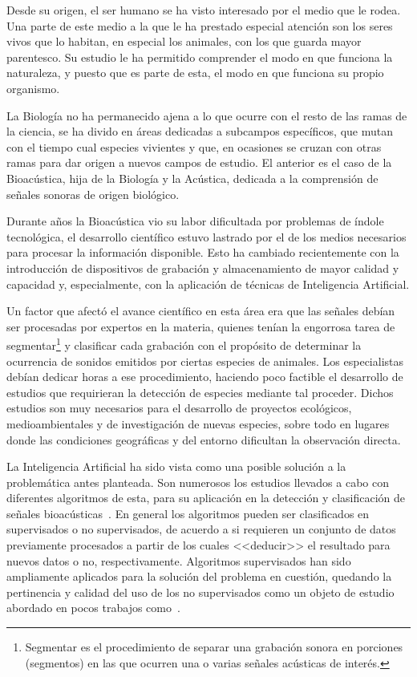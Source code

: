 Desde su origen, el ser humano se ha visto interesado por el medio que le rodea.
Una parte de este medio a la que le ha prestado especial atención son los seres vivos que lo habitan, en especial los animales, con los que guarda mayor parentesco.
Su estudio le ha permitido comprender el modo en que funciona la naturaleza, y puesto que es parte de esta, el modo en que funciona su propio organismo.

La Biología no ha permanecido ajena a lo que ocurre con el resto de las ramas de la ciencia, se ha divido en áreas dedicadas a subcampos específicos, que mutan con el tiempo cual especies vivientes y que, en ocasiones se cruzan con otras ramas para dar origen a nuevos campos de estudio.
El anterior es el caso de la Bioacústica, hija de la Biología y la Acústica, dedicada a la comprensión de señales sonoras de origen biológico.

Durante años la Bioacústica vio su labor dificultada por problemas de índole tecnológica, el desarrollo científico estuvo lastrado por el de los medios necesarios para procesar la información disponible.
Esto ha cambiado recientemente con la introducción de dispositivos de grabación y almacenamiento de mayor calidad y capacidad y, especialmente, con la aplicación de técnicas de Inteligencia Artificial.

Un factor que afectó el avance científico en esta área era que las señales debían ser procesadas por expertos en la materia, quienes tenían la engorrosa tarea de segmentar\footnote{Segmentar es el procedimiento de separar una grabación sonora en porciones (segmentos) en las que ocurren una o varias señales acústicas de interés.} y clasificar cada grabación con el propósito de determinar la ocurrencia de sonidos emitidos por ciertas especies de animales.
Los especialistas debían dedicar horas a ese procedimiento, haciendo poco factible el desarrollo de estudios que requirieran la detección de especies mediante tal proceder.
Dichos estudios son muy necesarios para el desarrollo de proyectos ecológicos, medioambientales y de investigación de nuevas especies, sobre todo en lugares donde las condiciones geográficas y del entorno dificultan la observación directa.

La Inteligencia Artificial ha sido vista como una posible solución a la problemática antes planteada.
Son numerosos los estudios llevados a cabo con diferentes algoritmos de esta, para su aplicación en la detección y clasificación de señales bioacústicas~\cite{Gerhard03}.
En general los algoritmos pueden ser clasificados en supervisados o no supervisados, de acuerdo a si requieren un conjunto de datos previamente procesados a partir de los cuales <<deducir>> el resultado para nuevos datos o no, respectivamente.
Algoritmos supervisados han sido ampliamente aplicados para la solución del problema en cuestión, quedando la pertinencia y calidad del uso de los no supervisados como un objeto de estudio abordado en pocos trabajos como~\cite{Jancovic13}.

